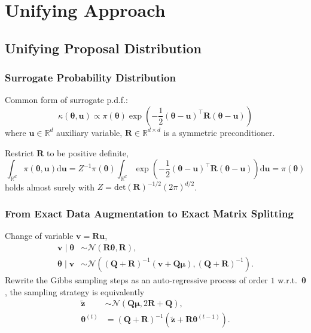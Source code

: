 \documentclass[aspectratio=169]{beamer}
\newcommand{\B}[1]{\mathbf{#1}} %
\newcommand{\Bs}[1]{\boldsymbol{#1}} %
\newcommand{\pr}[1]{\left(#1\right)} %
\begin{document}
\section{Unifying Approach}
\subsection{Unifying Proposal Distribution}
\begin{frame}
\frametitle{Surrogate Probability Distribution}
Common form of surrogate p.d.f.:
\[
  \kappa(\Bs{\theta},\B{u}) \propto \pi(\Bs{\theta})\exp\pr{-\frac{1}{2}(\Bs{\theta}-\B{u})^{\top}\B{R}(\Bs{\theta}-\B{u})}\]
  where $\B{u} \in \mathbb{R}^d$ auxiliary variable, $\B{R} \in \mathbb{R}^{d \times d}$ is a symmetric preconditioner.

Restrict $\B{R}$ to be positive definite,
\[  \int_{\mathbb{R}^d} \pi(\Bs{\theta},\B{u}) \text{d}\B{u} = Z^{-1}\pi(\Bs{\theta})\int_{\mathbb{R}^d} \exp\pr{-\frac{1}{2}(\Bs{\theta}-\B{u})^{\top}\B{R}(\Bs{\theta}-\B{u})}\text{d}\B{u} = \pi(\Bs{\theta})\]
holds almost surely with $Z = \text{det}(\B{R})^{-1/2}(2\pi)^{d/2}$.
\end{frame}

\begin{frame}
  \frametitle{From Exact Data Augmentation to Exact Matrix Splitting}
Change of variable $\B{v} = \B{Ru}$,
\[
  \begin{aligned}
    \B{v}\mid\Bs{\theta} &\sim \mathcal{N}\pr{\B{R}\Bs{\theta},\B{R}},\\
    \Bs{\theta}\mid\B{v} &\sim \mathcal{N}\pr{(\B{Q} + \B{R})^{-1}(\B{v}+\B{Q}\Bs{\mu}),(\B{Q} + \B{R})^{-1}}.
  \end{aligned}  
\]
Rewrite the Gibbs sampling steps as an auto-regressive process of order \(1\) w.r.t.\ $\Bs{\theta}$, the sampling strategy is equivalently
\[
\begin{aligned}
  \tilde{\B{z}} &\sim  \mathcal{N}\pr{\B{Q}\Bs{\mu}, 2\B{R} + \B{Q}},\\
  \Bs{\theta}^{(t)} & = \pr{\B{Q}+\B{R}}^{-1}\pr{\tilde{\B{z}}+\B{R}\Bs{\theta}^{(t-1)}}.
\end{aligned} 
\]
\end{frame}
\end{document}
